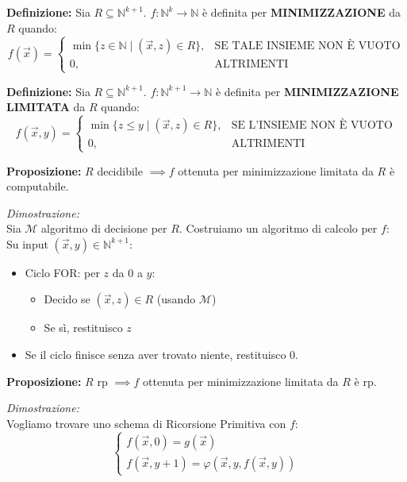 \vspace{0.6cm}
\textbf{Definizione:} Sia $R \subseteq \mathbb{N}^{k+1}$. $f: \mathbb{N}^k \to \mathbb{N}$ è definita per \textbf{MINIMIZZAZIONE} da $R$ quando:
$$
f(\vec{x}) = 
\begin{cases} 
\min \{ z \in \mathbb{N} \mid (\vec{x}, z) \in R \}, & \text{SE TALE INSIEME NON \`E VUOTO} \\ 
0, & \text{ALTRIMENTI} 
\end{cases}
$$

\vspace{0.4cm}
\textbf{Definizione:} Sia $R \subseteq \mathbb{N}^{k+1}$. $f: \mathbb{N}^{k+1} \to \mathbb{N}$ è definita per \textbf{MINIMIZZAZIONE LIMITATA} da $R$ quando:
$$
f(\vec{x}, y) = 
\begin{cases} 
\min \{ z \le y \mid (\vec{x}, z) \in R \}, & \text{SE L'INSIEME NON \`E VUOTO} \\ 
0, & \text{ALTRIMENTI} 
\end{cases}
$$

\vspace{0.4cm}
\textbf{Proposizione:} $R$ decidibile $\implies f$ ottenuta per minimizzazione limitata da $R$ è computabile.

\textit{Dimostrazione:} \\
Sia $\mathcal{M}$ algoritmo di decisione per $R$. Costruiamo un algoritmo di calcolo per $f$: \\
Su input $(\vec{x}, y) \in \mathbb{N}^{k+1}$:
\begin{itemize}
    \item Ciclo FOR: per $z$ da $0$ a $y$:
    \begin{itemize}
        \item Decido se $(\vec{x}, z) \in R$ (usando $\mathcal{M}$)
        \item Se sì, restituisco $z$
    \end{itemize}
    \item Se il ciclo finisce senza aver trovato niente, restituisco $0$.
\end{itemize}

\vspace{0.4cm}
\textbf{Proposizione:} $R$ rp $\implies f$ ottenuta per minimizzazione limitata da $R$ è rp.

\textit{Dimostrazione:} \\
Vogliamo trovare uno schema di Ricorsione Primitiva con $f$:
$$
\begin{cases} 
f(\vec{x}, 0) = g(\vec{x}) \\ 
f(\vec{x}, y+1) = \varphi(\vec{x}, y, f(\vec{x}, y)) 
\end{cases}
$$

